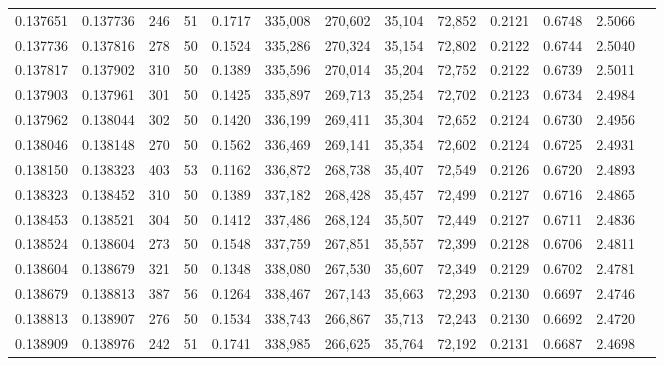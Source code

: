 \begin{tabular}{rrrrrrrrrrrrr}
0.137651 & 0.137736 &   246 &  51 &                                     0.1717 & 335,008 & 270,602 &  35,104 &  72,852 & 0.2121 & 0.6748 & 2.5066 \\
0.137736 & 0.137816 &   278 &  50 &                                     0.1524 & 335,286 & 270,324 &  35,154 &  72,802 & 0.2122 & 0.6744 & 2.5040 \\
0.137817 & 0.137902 &   310 &  50 &                                     0.1389 & 335,596 & 270,014 &  35,204 &  72,752 & 0.2122 & 0.6739 & 2.5011 \\
0.137903 & 0.137961 &   301 &  50 &                                     0.1425 & 335,897 & 269,713 &  35,254 &  72,702 & 0.2123 & 0.6734 & 2.4984 \\
0.137962 & 0.138044 &   302 &  50 &                                     0.1420 & 336,199 & 269,411 &  35,304 &  72,652 & 0.2124 & 0.6730 & 2.4956 \\
0.138046 & 0.138148 &   270 &  50 &                                     0.1562 & 336,469 & 269,141 &  35,354 &  72,602 & 0.2124 & 0.6725 & 2.4931 \\
0.138150 & 0.138323 &   403 &  53 &                                     0.1162 & 336,872 & 268,738 &  35,407 &  72,549 & 0.2126 & 0.6720 & 2.4893 \\
0.138323 & 0.138452 &   310 &  50 &                                     0.1389 & 337,182 & 268,428 &  35,457 &  72,499 & 0.2127 & 0.6716 & 2.4865 \\
0.138453 & 0.138521 &   304 &  50 &                                     0.1412 & 337,486 & 268,124 &  35,507 &  72,449 & 0.2127 & 0.6711 & 2.4836 \\
0.138524 & 0.138604 &   273 &  50 &                                     0.1548 & 337,759 & 267,851 &  35,557 &  72,399 & 0.2128 & 0.6706 & 2.4811 \\
0.138604 & 0.138679 &   321 &  50 &                                     0.1348 & 338,080 & 267,530 &  35,607 &  72,349 & 0.2129 & 0.6702 & 2.4781 \\
0.138679 & 0.138813 &   387 &  56 &                                     0.1264 & 338,467 & 267,143 &  35,663 &  72,293 & 0.2130 & 0.6697 & 2.4746 \\
0.138813 & 0.138907 &   276 &  50 &                                     0.1534 & 338,743 & 266,867 &  35,713 &  72,243 & 0.2130 & 0.6692 & 2.4720 \\
0.138909 & 0.138976 &   242 &  51 &                                     0.1741 & 338,985 & 266,625 &  35,764 &  72,192 & 0.2131 & 0.6687 & 2.4698 \\

\end{tabular}
